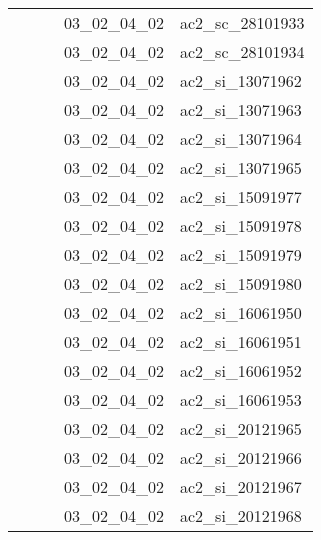 \documentclass[12pt,titlepage,oneside]{book}
\begin{document}
\begin{supertabular}{|p{7.5cm}|p{7.5cm}|p{7.5cm}|c|p{10cm}|}
                   &                    &                    & 03\_02\_04\_02 & ac2\_sc\_28101933\\
                   &                    &                    & 03\_02\_04\_02 & ac2\_sc\_28101934\\
                   &                    &                    & 03\_02\_04\_02 & ac2\_si\_13071962\\
                   &                    &                    & 03\_02\_04\_02 & ac2\_si\_13071963\\
                   &                    &                    & 03\_02\_04\_02 & ac2\_si\_13071964\\
                   &                    &                    & 03\_02\_04\_02 & ac2\_si\_13071965\\
                   &                    &                    & 03\_02\_04\_02 & ac2\_si\_15091977\\
                   &                    &                    & 03\_02\_04\_02 & ac2\_si\_15091978\\
                   &                    &                    & 03\_02\_04\_02 & ac2\_si\_15091979\\
                   &                    &                    & 03\_02\_04\_02 & ac2\_si\_15091980\\
                   &                    &                    & 03\_02\_04\_02 & ac2\_si\_16061950\\
                   &                    &                    & 03\_02\_04\_02 & ac2\_si\_16061951\\
                   &                    &                    & 03\_02\_04\_02 & ac2\_si\_16061952\\
                   &                    &                    & 03\_02\_04\_02 & ac2\_si\_16061953\\
                   &                    &                    & 03\_02\_04\_02 & ac2\_si\_20121965\\
                   &                    &                    & 03\_02\_04\_02 & ac2\_si\_20121966\\
                   &                    &                    & 03\_02\_04\_02 & ac2\_si\_20121967\\
                   &                    &                    & 03\_02\_04\_02 & ac2\_si\_20121968\\

\end{supertabular}
\end{document}
